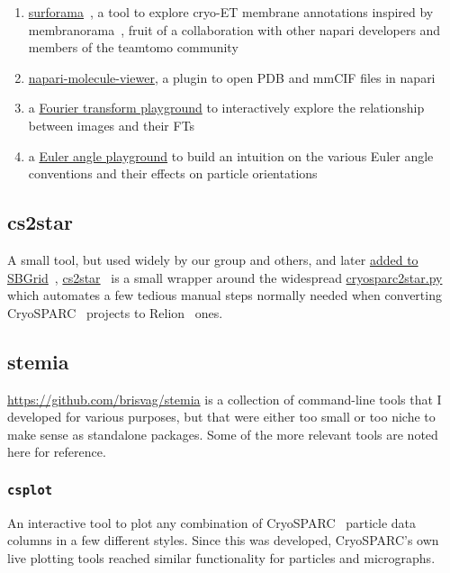 \begin{enumerate}
    \item \href{https://github.com/cellcanvas/surforama}{surforama}~\cite{yamauchiSurforamaInteractiveExploration2024}, a tool to explore cryo-ET membrane annotations inspired by membranorama~\cite{tegunovDtegunovMembranorama2024}, fruit of a collaboration with other napari developers and members of the teamtomo community
    \item \href{https://github.com/brisvag/napari-molecule-reader}{napari-molecule-viewer}, a plugin to open PDB and mmCIF files in napari
    \item a \href{https://github.com/napari/napari/blob/main/examples/fourier_transform_playground.py}{Fourier transform playground} to interactively explore the relationship between images and their FTs
    \item a \href{https://gist.github.com/brisvag/d6394d05b2f994e083ec279d6976484f}{Euler angle playground} to build an intuition on the various Euler angle conventions and their effects on particle orientations
\end{enumerate}

\subsection{cs2star}

A small tool, but used widely by our group and others, and later \href{https://sbgrid.org/software/titles/cs2star}{added to SBGrid}~\cite{morinCuttingEdgeCollaboration2013}, \href{https://github.com/brisvag/cs2star}{cs2star}~\cite{gaifasCs2starPy2021} is a small wrapper around the widespread \href{https://github.com/asarnow/pyem}{cryosparc2star.py} which automates a few tedious manual steps normally needed when converting CryoSPARC~\cite{punjaniCryoSPARCAlgorithmsRapid2017} projects to Relion~\cite{scheresRELIONImplementationBayesian2012} ones.

\subsection{stemia}

\href{Stemia}{https://github.com/brisvag/stemia} is a collection of command-line tools that I developed for various purposes, but that were either too small or too niche to make sense as standalone packages.
Some of the more relevant tools are noted here for reference.

\subsubsection{\texttt{csplot}}
An interactive tool to plot any combination of CryoSPARC~\cite{punjaniCryoSPARCAlgorithmsRapid2017} particle data columns in a few different styles.
Since this was developed, CryoSPARC's own live plotting tools reached similar functionality for particles and micrographs.

